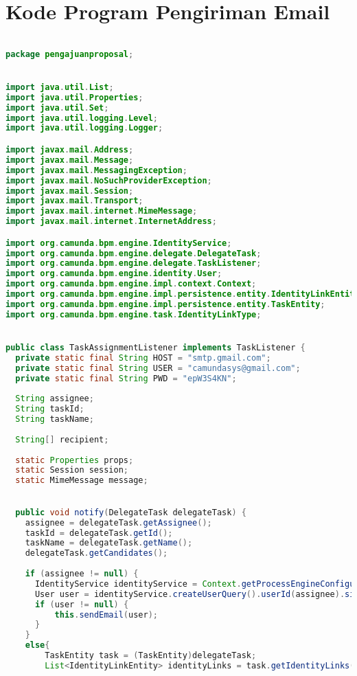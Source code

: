 \chapter{Kode Program Pengiriman Email}
\label{lamp:tasklistener}

\begin{lstlisting}[language=Java,basicstyle=\tiny,caption=TaskAssignmentListener.java]

package pengajuanproposal;


import java.util.List;
import java.util.Properties;
import java.util.Set;
import java.util.logging.Level;
import java.util.logging.Logger;

import javax.mail.Address;
import javax.mail.Message;
import javax.mail.MessagingException;
import javax.mail.NoSuchProviderException;
import javax.mail.Session;
import javax.mail.Transport;
import javax.mail.internet.MimeMessage;
import javax.mail.internet.InternetAddress;

import org.camunda.bpm.engine.IdentityService;
import org.camunda.bpm.engine.delegate.DelegateTask;
import org.camunda.bpm.engine.delegate.TaskListener;
import org.camunda.bpm.engine.identity.User;
import org.camunda.bpm.engine.impl.context.Context;
import org.camunda.bpm.engine.impl.persistence.entity.IdentityLinkEntity;
import org.camunda.bpm.engine.impl.persistence.entity.TaskEntity;
import org.camunda.bpm.engine.task.IdentityLinkType;


public class TaskAssignmentListener implements TaskListener {
  private static final String HOST = "smtp.gmail.com";
  private static final String USER = "camundasys@gmail.com";
  private static final String PWD = "epW3S4KN";
  
  String assignee;
  String taskId;
  String taskName;
  
  String[] recipient;
  
  static Properties props;
  static Session session;
  static MimeMessage message;
  

  public void notify(DelegateTask delegateTask) {
    assignee = delegateTask.getAssignee();
    taskId = delegateTask.getId();
    taskName = delegateTask.getName();
    delegateTask.getCandidates();
    
    if (assignee != null) {
      IdentityService identityService = Context.getProcessEngineConfiguration().getIdentityService();
      User user = identityService.createUserQuery().userId(assignee).singleResult();
      if (user != null) {
    	  this.sendEmail(user);
      }
    }
    else{
    	TaskEntity task = (TaskEntity)delegateTask;
    	List<IdentityLinkEntity> identityLinks = task.getIdentityLinks();
    	

\end{lstlisting}
